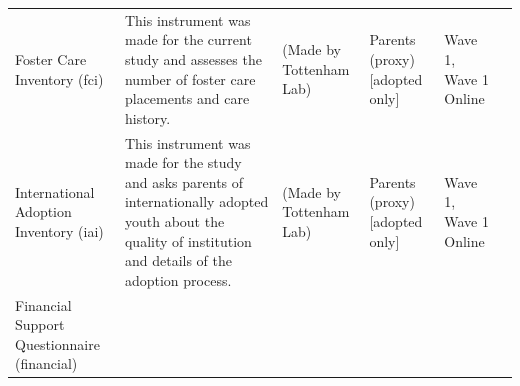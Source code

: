 \documentclass[]{book}
\begin{document}
\begin{longtable}[]{@{}llllll@{}}
\begin{minipage}[t]{0.18\columnwidth}\raggedright
Foster Care Inventory (fci)\strut
\end{minipage} & \begin{minipage}[t]{0.18\columnwidth}\raggedright
This instrument was made for the current study and assesses the number of foster care placements and care history.\strut
\end{minipage} & \begin{minipage}[t]{0.15\columnwidth}\raggedright
(Made by Tottenham Lab)\strut
\end{minipage} & \begin{minipage}[t]{0.16\columnwidth}\raggedright
Parents (proxy){[}adopted only{]}\strut
\end{minipage} & \begin{minipage}[t]{0.06\columnwidth}\raggedright
Wave 1, Wave 1 Online\strut
\end{minipage} & \begin{minipage}[t]{0.10\columnwidth}\raggedright
\strut
\end{minipage}\tabularnewline
\begin{minipage}[t]{0.18\columnwidth}\raggedright
International Adoption Inventory (iai)\strut
\end{minipage} & \begin{minipage}[t]{0.18\columnwidth}\raggedright
This instrument was made for the study and asks parents of internationally adopted youth about the quality of institution and details of the adoption process.\strut
\end{minipage} & \begin{minipage}[t]{0.15\columnwidth}\raggedright
(Made by Tottenham Lab)\strut
\end{minipage} & \begin{minipage}[t]{0.16\columnwidth}\raggedright
Parents (proxy){[}adopted only{]}\strut
\end{minipage} & \begin{minipage}[t]{0.06\columnwidth}\raggedright
Wave 1, Wave 1 Online\strut
\end{minipage} & \begin{minipage}[t]{0.10\columnwidth}\raggedright
\strut
\end{minipage}\tabularnewline
\begin{minipage}[t]{0.18\columnwidth}\raggedright
Financial Support Questionnaire (financial)\strut
\end{minipage} & \begin{minipage}[t]{0.18\columnwidth}\raggedright

\end{minipage}
\end{longtable}
\end{document}
